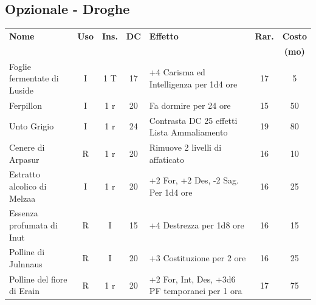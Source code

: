 \subsection{Opzionale - Droghe}\hypertarget{droghe}{}\label{droghe} 

\medskip

\noindent\begin{tabularx}{\linewidth}{lcccXcc}
	\toprule
\rowcolor{gray!20}\textbf{Nome}& \textbf{Uso} & \textbf{Ins.} & \textbf{DC} & \textbf{Effetto}& \textbf{Rar.} & \textbf{Costo} \\
\rowcolor{gray!20}&&&&&&\textbf{(mo)}\\
\toprule
Foglie fermentate di Luside\index{Foglie fermentate di Luside}& I& 1 T& 17&+4 Carisma ed Intelligenza per 1d4 ore& 17 & 5\\
\rowcolor{gray!20}Ferpillon \index{Ferpillon}& I& 1 r & 20& Fa dormire per 24 ore& 15 & 50 \\
Unto Grigio \index{Unto Grigio} & I& 1 r & 24& Contrasta DC 25 effetti Lista Ammaliamento& 19 & 80\\
\rowcolor{gray!20}Cenere di Arpasur \index{Cenere di Arpasur}& R& 1 r & 20& Rimuove 2 livelli di affaticato& 16 & 10\\
%
Estratto alcolico di Melzaa\index{Estratto alcolico di Melzaa}& I& 1 r & 20& +2 For, +2 Des, -2 Sag. Per 1d4 ore & 16 & 25 \\
\rowcolor{gray!20}Essenza profumata di Inut\index{Essenza profumata do Inut} & R& I& 15& +4 Destrezza per 1d8 ore& 16 & 15 \\
Polline di Julnnaus\index{Polline di Julnnaus} & R& I& 20& +3 Costituzione per 2 ore & 16 & 25\\
\rowcolor{gray!20}Polline del fiore di Erain \index{Polline del fiore di Erain} & R& 1 r& 20& +2 For, Int, Des, +3d6 PF temporanei per 1 ora& 17 & 75\\
\end{tabularx}

